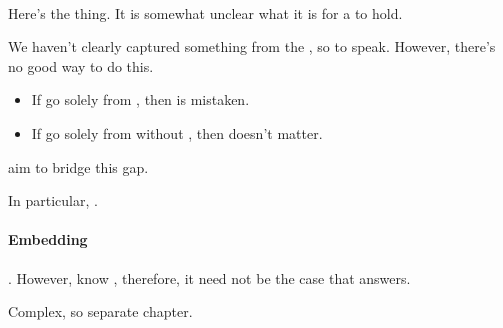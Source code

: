 
\paragraph{}

\begin{note}
  Here's the thing.
  It is somewhat unclear what it is for a \ros{} to hold.

  We haven't clearly captured something from the \agpe{}, so to speak.
  However, there's no good way to do this.

  \begin{itemize}
  \item
    If go solely from \agpe{}, then \agpe{} is mistaken.
  \item
    If go solely from without \agpe{}, then \agpe{} doesn't matter.
  \end{itemize}

   aim to bridge this gap.

  In particular, \ninf{}.
\end{note}

\paragraph{Embedding}
\label{sec:embedding}

\begin{note}
  \ros{}.
  However, know \fc{}, therefore, it need not be the case that \ros{} answers.

  Complex, so separate chapter.
\end{note}

